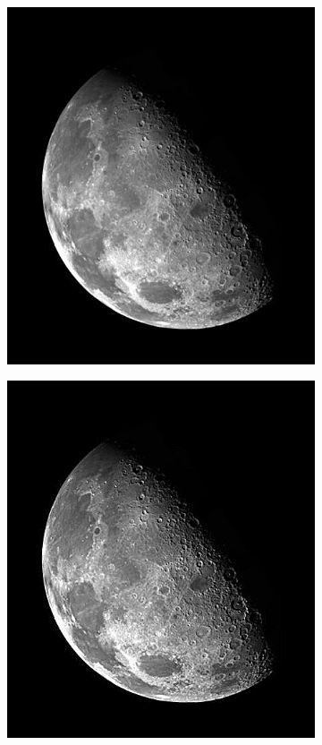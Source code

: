 \documentclass{article}
\begin{document}
\begin{figure}[htbp]
    \centering
    \begin{subfigure}{.32\textwidth}
        \includegraphics[width=\linewidth]{img/laplace/1.png}
    \end{subfigure}
    \begin{subfigure}{.32\textwidth}
        \includegraphics[width=\linewidth]{img/laplace/2.png}

\end{subfigure}
\end{figure}
\end{document}
